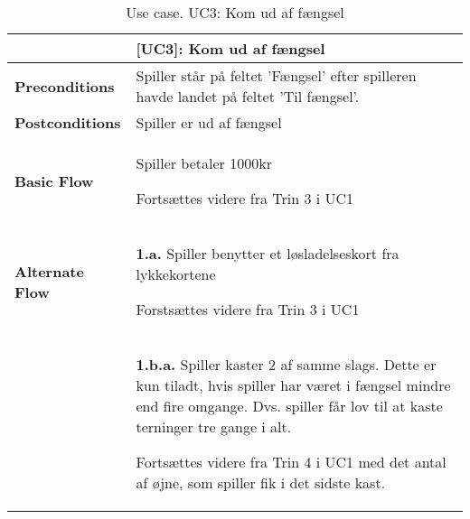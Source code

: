 \documentclass[class=article, crop=false]{standalone}
\begin{document}
    \begin{table}[H]
        \caption{Use case. UC3: Kom ud af fængsel}
        \begin{tabularx}{\textwidth}{|l|X|}
            \hline
            & \textbf{[UC3]: Kom ud af fængsel}   \\ \hline
            \textbf{Preconditions}       & Spiller står på feltet 'Fængsel' efter spilleren havde landet på feltet 'Til fængsel'. \\ \hline
            \textbf{Postconditions}      & Spiller er ud af fængsel \\ \hline


            \textbf{Basic Flow} & \begin{tabenum}
                                      \item Spiller betaler 1000kr
                                      \item Fortsættes videre fra Trin 3 i UC1
            \end{tabenum}   \\ \hline


            \textbf{Alternate Flow}  & \textbf{1.a.} Spiller benytter et løsladelseskort fra lykkekortene
                                    \begin{enumerate} \begin{tabenum}
                                                          \item Forstsættes videre fra Trin 3 i UC1
                                    \end{tabenum} \end{enumerate}
                                    \\


                                   & \textbf{1.b.a.} Spiller kaster 2 af samme slags. Dette er kun tiladt, hvis spiller har været i fængsel mindre end fire omgange. Dvs. spiller får lov til at kaste terninger tre gange i alt.
            \begin{enumerate} \begin{tabenum}
                                  \item Fortsættes videre fra Trin 4 i UC1 med det antal af øjne, som spiller fik i det sidste kast.
            \end{tabenum} \end{enumerate}
            \\






\end{tabularx}
\end{table}
\end{document}
